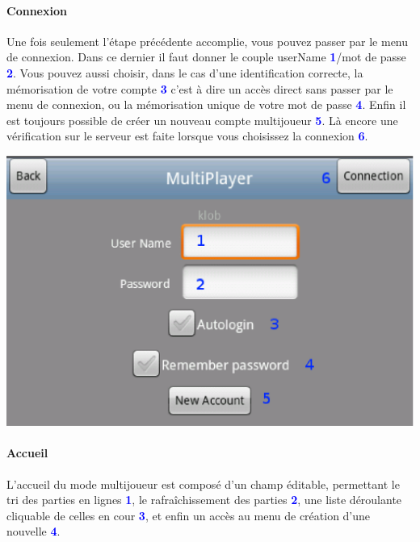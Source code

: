 	\paragraph{Connexion}
		Une fois seulement l'étape précédente accomplie, vous pouvez passer par le
		menu de connexion. Dans ce dernier il faut donner le couple
		userName \textcolor{blue}{\textbf{1}}/mot de passe
		\textcolor{blue}{\textbf{2}}. Vous pouvez aussi choisir, dans le cas d'une
		identification correcte, la mémorisation de votre compte
		\textcolor{blue}{\textbf{3}} c'est à dire un accès direct sans passer par le
		menu de connexion, ou la mémorisation unique de votre mot de passe
		\textcolor{blue}{\textbf{4}}. Enfin il est toujours possible de créer un
		nouveau compte multijoueur \textcolor{blue}{\textbf{5}}. Là encore une
		vérification sur le serveur est faite lorsque vous choisissez la connexion
		\textcolor{blue}{\textbf{6}}.
		
		\begin{center}
			\includegraphics[scale=0.7]{Manuel/Img/17.eps}
		\end{center}
	
	\paragraph{Accueil}
	L'accueil du mode multijoueur est composé d'un champ éditable, permettant le
	tri des parties en lignes \textcolor{blue}{\textbf{1}}, le rafraîchissement des
	parties \textcolor{blue}{\textbf{2}}, une liste déroulante cliquable de celles
	en cour \textcolor{blue}{\textbf{3}}, et enfin un accès au menu de création
	d'une nouvelle \textcolor{blue}{\textbf{4}}.
	

